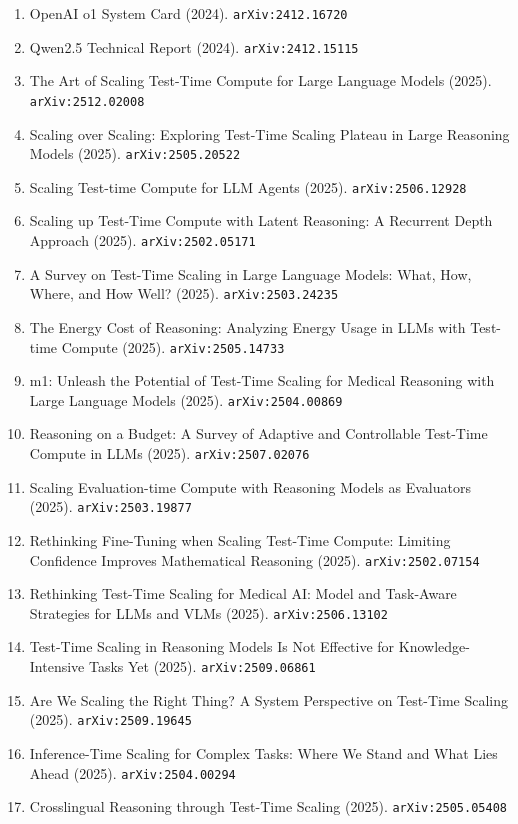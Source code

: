 \documentclass[11pt]{article}
\begin{document}
\begin{enumerate}
  \item OpenAI o1 System Card (2024). \texttt{arXiv:2412.16720}
  \item Qwen2.5 Technical Report (2024). \texttt{arXiv:2412.15115}
  \item The Art of Scaling Test-Time Compute for Large Language Models (2025). \texttt{arXiv:2512.02008}
  \item Scaling over Scaling: Exploring Test-Time Scaling Plateau in Large Reasoning Models (2025). \texttt{arXiv:2505.20522}
  \item Scaling Test-time Compute for LLM Agents (2025). \texttt{arXiv:2506.12928}
  \item Scaling up Test-Time Compute with Latent Reasoning: A Recurrent Depth
  Approach (2025). \texttt{arXiv:2502.05171}
  \item A Survey on Test-Time Scaling in Large Language Models: What, How,
  Where, and How Well? (2025). \texttt{arXiv:2503.24235}
  \item The Energy Cost of Reasoning: Analyzing Energy Usage in LLMs with Test-time Compute (2025). \texttt{arXiv:2505.14733}
  \item m1: Unleash the Potential of Test-Time Scaling for Medical Reasoning with Large Language Models (2025). \texttt{arXiv:2504.00869}
  \item Reasoning on a Budget: A Survey of Adaptive and Controllable Test-Time Compute in LLMs (2025). \texttt{arXiv:2507.02076}
  \item Scaling Evaluation-time Compute with Reasoning Models as Evaluators (2025). \texttt{arXiv:2503.19877}
  \item Rethinking Fine-Tuning when Scaling Test-Time Compute: Limiting Confidence Improves Mathematical Reasoning (2025). \texttt{arXiv:2502.07154}
  \item Rethinking Test-Time Scaling for Medical AI: Model and Task-Aware Strategies for LLMs and VLMs (2025). \texttt{arXiv:2506.13102}
  \item Test-Time Scaling in Reasoning Models Is Not Effective for Knowledge-Intensive Tasks Yet (2025). \texttt{arXiv:2509.06861}
  \item Are We Scaling the Right Thing? A System Perspective on Test-Time Scaling (2025). \texttt{arXiv:2509.19645}
  \item Inference-Time Scaling for Complex Tasks: Where We Stand and What Lies
  Ahead (2025). \texttt{arXiv:2504.00294}
  \item Crosslingual Reasoning through Test-Time Scaling (2025). \texttt{arXiv:2505.05408}

\end{enumerate}
\end{document}
